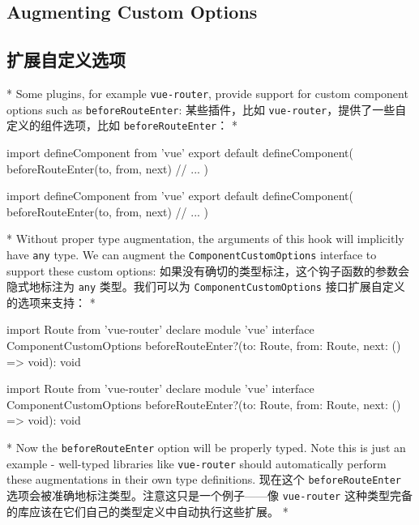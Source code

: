 \begin{paracol}{2}
\subsection{Augmenting Custom Options}
\switchcolumn
\subsection{扩展自定义选项}
\switchcolumn[0]*%
Some plugins, for example \texttt{vue-router}, provide support for
custom component options such as \texttt{beforeRouteEnter}:
\switchcolumn
某些插件，比如 \texttt{vue-router}，提供了一些自定义的组件选项，比如
\texttt{beforeRouteEnter}：
\switchcolumn[0]*%
\begin{codeTs}
import { defineComponent } from 'vue'
export default defineComponent({
  beforeRouteEnter(to, from, next) {
    // ...
  }
})
\end{codeTs}
\switchcolumn
\begin{codeTs}
import { defineComponent } from 'vue'
export default defineComponent({
  beforeRouteEnter(to, from, next) {
    // ...
  }
})
\end{codeTs}
\switchcolumn[0]*%
Without proper type augmentation, the arguments of this hook will
implicitly have \texttt{any} type. We can augment the
\texttt{ComponentCustomOptions} interface to support these custom
options:
\switchcolumn
如果没有确切的类型标注，这个钩子函数的参数会隐式地标注为 \texttt{any}
类型。我们可以为 \texttt{ComponentCustomOptions}
接口扩展自定义的选项来支持：
\switchcolumn[0]*%
\begin{codeTs}
import { Route } from 'vue-router'
declare module 'vue' {
  interface ComponentCustomOptions {
    beforeRouteEnter?(to: Route, from: Route, next: () => void): void
  }
}
\end{codeTs}
\switchcolumn
\begin{codeTs}
import { Route } from 'vue-router'
declare module 'vue' {
  interface ComponentCustomOptions {
    beforeRouteEnter?(to: Route, from: Route, next: () => void): void
  }
}
\end{codeTs}
\switchcolumn[0]*%
Now the \texttt{beforeRouteEnter} option will be properly typed. Note
this is just an example - well-typed libraries like \texttt{vue-router}
should automatically perform these augmentations in their own type
definitions.
\switchcolumn
现在这个 \texttt{beforeRouteEnter}
选项会被准确地标注类型。注意这只是一个例子------像 \texttt{vue-router}
这种类型完备的库应该在它们自己的类型定义中自动执行这些扩展。
\switchcolumn[0]*%

\end{paracol}
